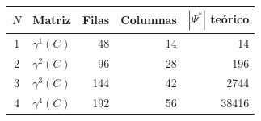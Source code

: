\begin{tabular}{c l r r r}
\toprule
$N$ & Matriz & Filas & Columnas & $|\Psi^*|$ teórico \\
\midrule
1 & $\gamma^{1}(C)$ & 48 & 14 & 14 \\
2 & $\gamma^{2}(C)$ & 96 & 28 & 196 \\
3 & $\gamma^{3}(C)$ & 144 & 42 & 2744 \\
4 & $\gamma^{4}(C)$ & 192 & 56 & 38416 \\
\bottomrule
\end{tabular}
